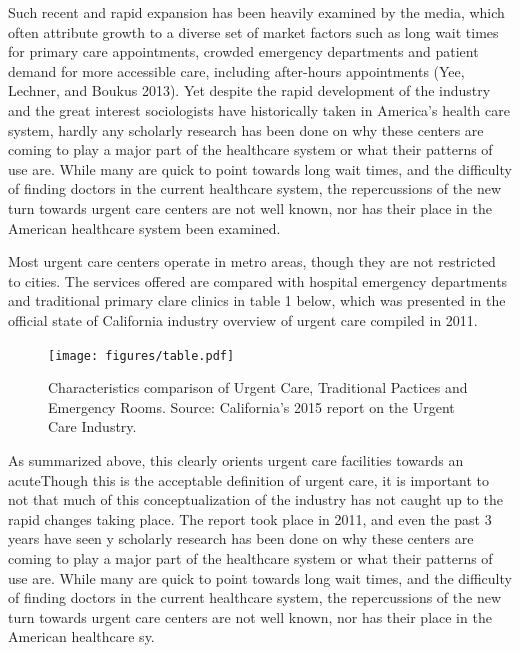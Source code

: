 \documentclass[12pt,twoside]{reedthesis}
\begin{document}
  Such recent and rapid expansion has been heavily examined by the media,
  which often attribute growth to a diverse set of market factors such as
  long wait times for primary care appointments, crowded emergency
  departments and patient demand for more accessible care, including
  after-hours appointments (Yee, Lechner, and Boukus 2013). Yet despite
  the rapid development of the industry and the great interest
  sociologists have historically taken in America's health care system,
  hardly any scholarly research has been done on why these centers are
  coming to play a major part of the healthcare system or what their
  patterns of use are. While many are quick to point towards long wait
  times, and the difficulty of finding doctors in the current healthcare
  system, the repercussions of the new turn towards urgent care centers
  are not well known, nor has their place in the American healthcare
  system been examined.
  
  Most urgent care centers operate in metro areas, though they are not
  restricted to cities. The services offered are compared with hospital
  emergency departments and traditional primary clare clinics in table 1
  below, which was presented in the official state of California industry
  overview of urgent care compiled in 2011.
  
  \begin{figure}[h!]
  \centering
  \texttt{[image: figures/table.pdf]}
  \caption[Comparison of the Characteristics of Three Care Options]{\small{Characteristics comparison of Urgent Care, Traditional Pactices and Emergency Rooms. Source: California's 2015 report on the Urgent Care Industry.}}
  \label{fig:tab1}
  \end{figure}
  
  As summarized above, this clearly orients urgent care facilities towards
  an acuteThough this is the acceptable definition of urgent care, it is
  important to not that much of this conceptualization of the industry has
  not caught up to the rapid changes taking place. The report took place
  in 2011, and even the past 3 years have seen y scholarly research has
  been done on why these centers are coming to play a major part of the
  healthcare system or what their patterns of use are. While many are
  quick to point towards long wait times, and the difficulty of finding
  doctors in the current healthcare system, the repercussions of the new
  turn towards urgent care centers are not well known, nor has their place
  in the American healthcare sy.
  
\end{document}
